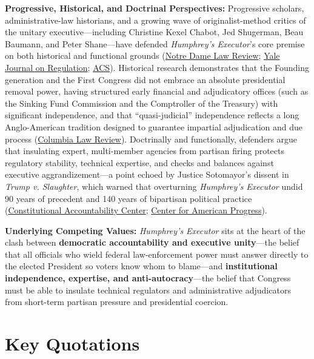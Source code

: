 \documentclass[12pt]{article}
\begin{document}
\textbf{Progressive, Historical, and Doctrinal Perspectives:} Progressive scholars, administrative-law historians, and a growing wave of originalist-method critics of the unitary executive---including Christine Kexel Chabot, Jed Shugerman, Beau Baumann, and Peter Shane---have defended \textit{Humphrey's Executor}'s core premise on both historical and functional grounds (\href{https://ndlawreview.org/interring-the-unitary-executive/}{Notre Dame Law Review}; \href{https://www.yalejreg.com/nc/quasi-judicial-a-history-and-tradition-by-beau-j-baumann-jed-h-shugerman/}{Yale Journal on Regulation}; \href{https://www.acslaw.org/seila-law-lcc-v-cfpb-and-the-persistent-myths-of-presidentialism/}{ACS}). Historical research demonstrates that the Founding generation and the First Congress did not embrace an absolute presidential removal power, having structured early financial and adjudicatory offices (such as the Sinking Fund Commission and the Comptroller of the Treasury) with significant independence, and that ``quasi-judicial'' independence reflects a long Anglo-American tradition designed to guarantee impartial adjudication and due process (\href{https://www.columbialawreview.org/content/quasi-judicial-a-history-and-tradition/}{Columbia Law Review}). Doctrinally and functionally, defenders argue that insulating expert, multi-member agencies from partisan firing protects regulatory stability, technical expertise, and checks and balances against executive aggrandizement---a point echoed by Justice Sotomayor's dissent in \textit{Trump v. Slaughter}, which warned that overturning \textit{Humphrey's Executor} undid 90 years of precedent and 140 years of bipartisan political practice (\href{https://www.theusconstitution.org/litigation/slaughter-v-trump/}{Constitutional Accountability Center}; \href{https://www.americanprogress.org/article/what-is-humphreys-executor-and-why-should-you-care-about-it/}{Center for American Progress}).

\textbf{Underlying Competing Values:} \textit{Humphrey's Executor} sits at the heart of the clash between \textbf{democratic accountability and executive unity}---the belief that all officials who wield federal law-enforcement power must answer directly to the elected President so voters know whom to blame---and \textbf{institutional independence, expertise, and anti-autocracy}---the belief that Congress must be able to insulate technical regulators and administrative adjudicators from short-term partisan pressure and presidential coercion.

\section{Key Quotations}
\end{document}
